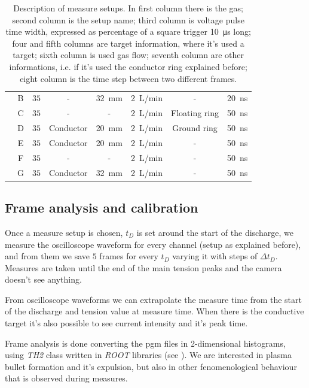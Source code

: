 \begin{table}
\begin{tabular}{cccccccc}
                            &B  &$\num{35}$ &-  &\SI{32}{\milli\meter}  &\SI{2}{\liter/\minute} &-  &\SI{20}{\nano\second}\\
                            &C  &$\num{35}$ &-  &-  &\SI{2}{\liter/\minute} &Floating ring  &\SI{50}{\nano\second}\\
                            &D  &$\num{35}$ &Conductor  &\SI{20}{\milli\meter}  &\SI{2}{\liter/\minute} &Ground ring  &\SI{50}{\nano\second}\\
                            &E  &$\num{35}$ &Conductor  &\SI{20}{\milli\meter}  &\SI{2}{\liter/\minute} &-  &\SI{50}{\nano\second}\\
                            &F  &$\num{35}$ &-  &-  &\SI{2}{\liter/\minute} &-  &\SI{50}{\nano\second}\\
                            &G  &$\num{35}$ &Conductor  &\SI{32}{\milli\meter}  &\SI{2}{\liter/\minute} &-  &\SI{50}{\nano\second}\\
  \bottomrule
 \end{tabular}
 \caption{Description of measure setups. In first column there is the gas; second column is the setup name; third column is voltage pulse time width, expressed as percentage of a square trigger \SI{10}{\micro\second} long; four and fifth columns are target information, where it's used a target; sixth column is used gas flow; seventh column are other informations, i.e. if it's used the conductor ring explained before; eight column is the time step between two different frames.}
 \label{tab:setups}
\end{table}


\subsection{Frame analysis and calibration}
Once a measure setup is chosen, $t_D$ is set around the start of the discharge, we measure the oscilloscope waveform for every channel (setup as explained before), and from them we save $5$ frames for every $t_D$ varying it with steps of $\Delta t_D$. Measures are taken until the end of the main tension peaks and the camera doesn't see anything.


From oscilloscope waveforms we can extrapolate the measure time from the start of the discharge and tension value at measure time. When there is the conductive target it's also possible to see current intensity and it's peak time.


Frame analysis is done converting the pgm files in 2-dimensional histograms, using \emph{TH2} class written in \emph{ROOT} libraries (see \cite{ROOT:TH2}).
We are interested in plasma bullet formation and it's expulsion, but also in other fenomenological behaviour that is observed during measures.

